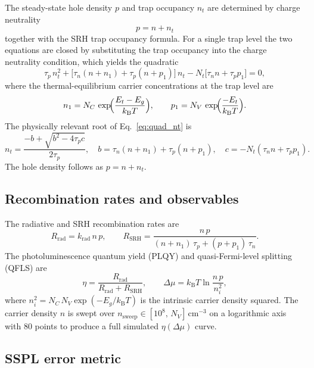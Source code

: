 \documentclass[a4paper,11pt]{article}
\newcommand{\kT}{k_\mathrm{B}T}
\begin{document}
The steady-state hole density $p$ and trap occupancy $n_t$ are determined by
charge neutrality
\begin{equation}
  p = n + n_t
\end{equation}
together with the SRH trap occupancy formula. For a single trap level the two
equations are closed by substituting the trap occupancy into the charge
neutrality condition, which yields the quadratic
\begin{equation}
  \tau_p\, n_t^2
  + \bigl[\tau_n(n + n_1) + \tau_p(n + p_1)\bigr]\, n_t
  - N_t\bigl[\tau_n n + \tau_p p_1\bigr] = 0,
  \label{eq:quad_nt}
\end{equation}
where the thermal-equilibrium carrier concentrations at the trap level are
\begin{equation}
  n_1 = N_C\,\exp\!\Bigl(\frac{E_t - E_g}{\kT}\Bigr),
  \qquad
  p_1 = N_V\,\exp\!\Bigl(\frac{-E_t}{\kT}\Bigr).
\end{equation}
The physically relevant root of Eq.~\eqref{eq:quad_nt} is
\begin{equation}
  n_t = \frac{-b + \sqrt{b^2 - 4\tau_p c}}{2\tau_p},
  \quad
  b = \tau_n(n+n_1)+\tau_p(n+p_1),
  \quad
  c = -N_t(\tau_n n + \tau_p p_1).
\end{equation}
The hole density follows as $p = n + n_t$.

\subsection{Recombination rates and observables}

The radiative and SRH recombination rates are
\begin{equation}
  R_\mathrm{rad} = k_\mathrm{rad}\,n\,p,
  \qquad
  R_\mathrm{SRH} = \frac{n\,p}{(n + n_1)\,\tau_p + (p + p_1)\,\tau_n}.
\end{equation}
The photoluminescence quantum yield (PLQY) and quasi-Fermi-level splitting
(QFLS) are
\begin{equation}
  \eta = \frac{R_\mathrm{rad}}{R_\mathrm{rad} + R_\mathrm{SRH}},
  \qquad
  \Delta\mu = \kT\ln\!\frac{n\,p}{n_i^2},
\end{equation}
where $n_i^2 = N_C\,N_V\exp(-E_g/\kT)$ is the intrinsic carrier density
squared. The carrier density $n$ is swept over $n_\mathrm{sweep} \in
[10^8,\,N_V]$\,cm$^{-3}$ on a logarithmic axis with 80 points to produce a
full simulated $\eta(\Delta\mu)$ curve.

\subsection{SSPL error metric}
\end{document}
